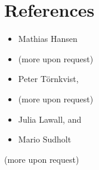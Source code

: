 \documentclass[11pt,a4paper,sans]{moderncv}}
\begin{document}
\section{References}
\begin{cvcolumns}
      {\begin{itemize}
      \item Mathias Hansen 
      \item(more upon request)
      \end{itemize}}
    {\begin{itemize}
        \item Peter Törnkvist, 
        \item(more upon request)
        \end{itemize}}
    
    {\begin{itemize}
            \item Julia Lawall, and
            \item   Mario Sudholt
    \end{itemize}(more upon request)}
\end{cvcolumns}
\footnotesize



\nocite{*}


\clearpage
\Large
\end{document}
